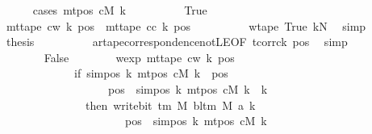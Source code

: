 \begin{isabellebody}
\ \ \ \ \isamarkupfalse%
\ {\isacharparenleft}{\kern0pt}cases\ {\isachardoublequoteopen}mt{\isacharunderscore}{\kern0pt}pos\ cM\ k\ {\isacharequal}{\kern0pt}\ {}{\isachardoublequoteclose}{\isacharparenright}{\kern0pt}\isanewline
\ \ \ \ \ \ \isamarkupfalse%
\ True\isanewline
\ \ \ \ \ \ \isamarkupfalse%
\ {\isachardoublequoteopen}mt{\isacharunderscore}{\kern0pt}tape\ c{\isacharunderscore}{\kern0pt}w\ k\ pos\ {\isacharequal}{\kern0pt}\ mt{\isacharunderscore}{\kern0pt}tape\ c{\isacharunderscore}{\kern0pt}c\ k\ pos{\isachardoublequoteclose}\isanewline
\ \ \ \ \ \ \ \ \isamarkupfalse%
\ w{\isacharunderscore}{\kern0pt}tape\ True\ kN\ \isamarkupfalse%
\ simp\isanewline
\ \ \ \ \ \ \isamarkupfalse%
\ {\isacharquery}{\kern0pt}thesis\isanewline
\ \ \ \ \ \ \ \ \isamarkupfalse%
\ ar{\isacharunderscore}{\kern0pt}tape{\isacharunderscore}{\kern0pt}correspondence{\isacharunderscore}{\kern0pt}not{\isacharunderscore}{\kern0pt}LE{}{\isacharbrackleft}{\kern0pt}OF\ tcorr{\isacharunderscore}{\kern0pt}ck\ pos{}{\isacharbrackright}{\kern0pt}\ \isamarkupfalse%
\ simp\isanewline
\ \ \ \ \isamarkupfalse%
\isanewline
\ \ \ \ \ \ \isamarkupfalse%
\ False\isanewline
\ \ \ \ \ \ \isamarkupfalse%
\ wexp{\isacharcolon}{\kern0pt}\ {\isachardoublequoteopen}mt{\isacharunderscore}{\kern0pt}tape\ c{\isacharunderscore}{\kern0pt}w\ k\ pos\isanewline
\ \ \ \ \ \ \ \ \ \ \ \ {\isacharequal}{\kern0pt}\ {\isacharparenleft}{\kern0pt}if\ sim{\isacharunderscore}{\kern0pt}pos\ {\isacharquery}{\kern0pt}k\ {\isacharparenleft}{\kern0pt}mt{\isacharunderscore}{\kern0pt}pos\ cM\ k{\isacharparenright}{\kern0pt}\ {\isasymle}\ pos\isanewline
\ \ \ \ \ \ \ \ \ \ \ \ \ \ \ \ \ \ {\isasymand}\ pos\ {\isacharless}{\kern0pt}\ sim{\isacharunderscore}{\kern0pt}pos\ {\isacharquery}{\kern0pt}k\ {\isacharparenleft}{\kern0pt}mt{\isacharunderscore}{\kern0pt}pos\ cM\ k{\isacharparenright}{\kern0pt}\ {\isacharplus}{\kern0pt}\ {\isacharquery}{\kern0pt}k\isanewline
\ \ \ \ \ \ \ \ \ \ \ \ \ \ \ then\ write{\isacharunderscore}{\kern0pt}bit\ {\isacharparenleft}{\kern0pt}{\isasymGamma}{\isacharunderscore}{\kern0pt}tm\ M{\isacharparenright}{\kern0pt}\ {\isacharparenleft}{\kern0pt}bl{\isacharunderscore}{\kern0pt}tm\ M{\isacharparenright}{\kern0pt}\ {\isacharparenleft}{\kern0pt}a{\isacharprime}{\kern0pt}\ k{\isacharparenright}{\kern0pt}\isanewline
\ \ \ \ \ \ \ \ \ \ \ \ \ \ \ \ \ \ \ \ \ \ {\isacharparenleft}{\kern0pt}pos\ {\isacharminus}{\kern0pt}\ sim{\isacharunderscore}{\kern0pt}pos\ {\isacharquery}{\kern0pt}k\ {\isacharparenleft}{\kern0pt}mt{\isacharunderscore}{\kern0pt}pos\ cM\ k{\isacharparenright}{\kern0pt}{\isacharparenright}{\kern0pt}\isanewline

\end{isabellebody}
